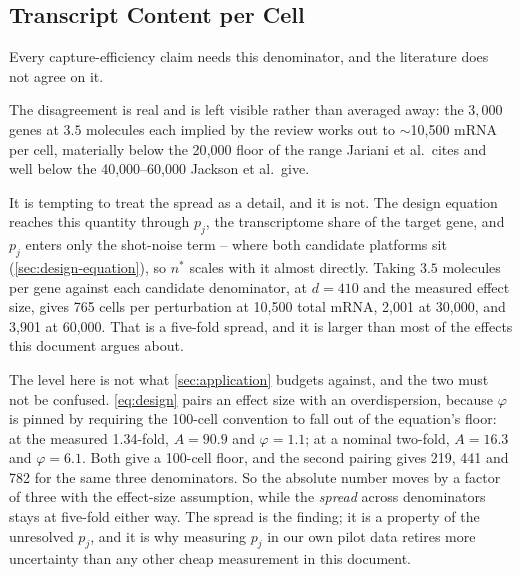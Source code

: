 \subsection{Transcript Content per Cell}
\label{sec:transcript-content}

Every capture-efficiency claim needs this denominator, and the literature does
not agree on it.



The disagreement is real and is left visible rather than averaged away: the
$3{,}000$ genes at $3.5$ molecules each implied by the review works out to
$\sim$10{,}500 mRNA per cell, materially below the 20{,}000 floor of the range
Jariani et al.\ cites and well below the 40{,}000--60{,}000 Jackson et al.\ give.

It is tempting to treat the spread as a detail, and it is not. The design
equation reaches this quantity through $p_j$, the transcriptome share of the
target gene, and $p_j$ enters only the shot-noise term -- where both candidate
platforms sit (\cref{sec:design-equation}), so $n^{*}$ scales with it almost
directly. Taking $3.5$ molecules per gene against each candidate denominator, at
$d=410$ and the measured effect size, gives
765 cells per perturbation at 10{,}500 total mRNA, 2{,}001 at 30{,}000, and
3{,}901 at 60{,}000. That is a five-fold spread, and it is larger than most of
the effects this document argues about.

 The level here is not what
\cref{sec:application} budgets against, and the two must not be confused.
\cref{eq:design} pairs an effect size with an overdispersion, because
$\varphi$ is pinned by requiring the 100-cell convention to fall out of the
equation's floor: at the measured 1.34-fold, $A=90.9$ and $\varphi=1.1$; at a
nominal two-fold, $A=16.3$ and $\varphi=6.1$. Both give a 100-cell floor, and
the second pairing gives 219, 441 and 782 for the same three denominators. So
the absolute number moves by a factor of three with the effect-size assumption,
while the \emph{spread} across denominators stays at five-fold either way. The
spread is the finding; it is a property of the unresolved $p_j$, and it is why
measuring $p_j$ in our own pilot data retires more uncertainty than any other
cheap measurement in this document.

